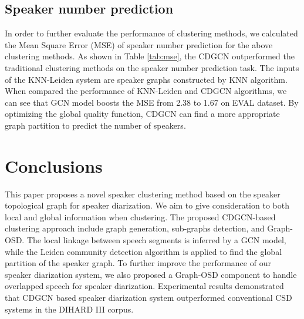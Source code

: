 \documentclass[10pt]{article}
\begin{document}
\vspace{-0.4cm}
\subsection{Speaker number prediction}
In order to further evaluate the performance of clustering methods, we calculated the Mean Square Error (MSE) of speaker number prediction for the above clustering methods. As shown in Table \ref{tab:mse}, the CDGCN outperformed the traditional clustering methods on the speaker number prediction task. The inputs of the KNN-Leiden system are speaker graphs constructed by KNN algorithm. When compared the performance of KNN-Leiden and CDGCN algorithms, we can see that GCN model boosts the MSE from 2.38 to 1.67 on EVAL dataset. By optimizing the global quality function, CDGCN can find a more appropriate graph partition to predict the number of speakers.

\section{Conclusions}
This paper proposes a novel speaker clustering method based on the speaker topological graph for speaker diarization. We aim to give consideration to both local and global information when clustering. The proposed CDGCN-based clustering approach include graph generation, sub-graphs detection, and Graph-OSD. The local linkage between speech segments is inferred by a GCN model, while the Leiden community detection algorithm is applied to find the global partition of the speaker graph.
To further improve the performance of our speaker diarization system, we also proposed a Graph-OSD component to handle overlapped speech for speaker diarization. Experimental results demonstrated that CDGCN based speaker diarization system outperformed conventional CSD systems in the DIHARD III corpus.

\label{sec:conclusions}



\end{document}
